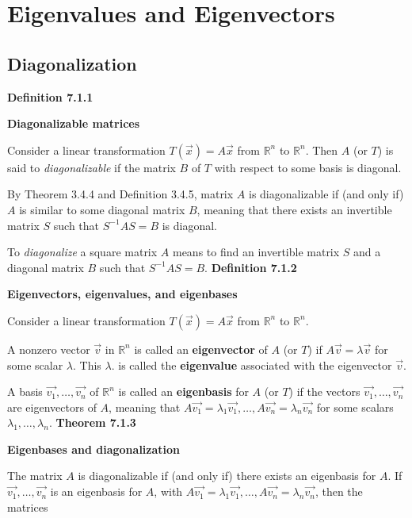 \section{Eigenvalues and Eigenvectors}

\subsection{Diagonalization}
\textbf{Definition 7.1.1}\\
\par\noindent\textbf{Diagonalizable matrices}
\par\noindent Consider a linear transformation $T(\vec{x})=A\vec{x}$ from $\mathbb{R}^{n}$ to $\mathbb{R}^{n}$. Then $A$ (or $T$) is said to \textit{diagonalizable} if the matrix $B$ of $T$ with respect to some basis is diagonal.
\par By Theorem 3.4.4 and Definition 3.4.5, matrix $A$ is diagonalizable if (and only if) $A$ is similar to some diagonal matrix $B$, meaning that there exists an invertible matrix $S$ such that $S^{-1}AS=B$ is diagonal.
\par To \textit{diagonalize} a square matrix $A$ means to find an invertible matrix $S$ and a diagonal matrix $B$ such that $S^{-1}AS=B$.
\textbf{Definition 7.1.2}\\
\par\noindent\textbf{Eigenvectors, eigenvalues, and eigenbases}
\par\noindent Consider a linear transformation $T(\vec{x})=A\vec{x}$ from $\mathbb{R}^{n}$ to $\mathbb{R}^{n}$.
\par A nonzero vector $\vec{v}$ in $\mathbb{R}^{n}$ is called an \textbf{eigenvector} of $A$ (or $T$) if $A\vec{v}=\lambda{}\vec{v}$ for some scalar $\lambda{}$. This $\lambda{}$. is called the \textbf{eigenvalue} associated with the eigenvector $\vec{v}$.
\par A basis $\vec{v_{1}},\ldots{},\vec{v_{n}}$ of $\mathbb{R}^{n}$ is called an \textbf{eigenbasis} for $A$ (or $T$) if the vectors $\vec{v_{1}},\ldots{},\vec{v_{n}}$ are eigenvectors of $A$, meaning that $A\vec{v_{1}}=\lambda{}_{1}\vec{v_{1}},\ldots{},A\vec{v_{n}}=\lambda{}_{n}\vec{v_{n}}$ for some scalars $\lambda{}_{1},\ldots{},\lambda{}_{n}$.
\textbf{Theorem 7.1.3}\\
\par\noindent\textbf{Eigenbases and diagonalization}
\par\noindent The matrix $A$ is diagonalizable if (and only if) there exists an eigenbasis for $A$. If $\vec{v_{1}},\ldots{},\vec{v_{n}}$ is an eigenbasis for $A$, with $A\vec{v_{1}}=\lambda{}_{1}\vec{v_{1}},\ldots{},A\vec{v_{n}}=\lambda{}_{n}\vec{v_{n}}$, then the matrices
